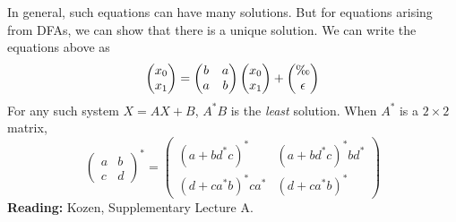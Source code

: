 In general, such equations can have many solutions.
But for equations arising from DFAs, we can show that there is a unique
solution.
We can write the equations above as \[
    \begin{pmatrix}
        x_0 \\
        x_1
    \end{pmatrix} = \begin{pmatrix}
        b & a \\
        a & b
    \end{pmatrix} \begin{pmatrix}
        x_0 \\
        x_1
    \end{pmatrix} + \begin{pmatrix}
        \O \\
        \epsilon
    \end{pmatrix}
\]
For any such system $X = AX + B$, $A^*B$ is the \emph{least} solution.
When $A^*$ is a $2 \times 2$ matrix, \[
    \begin{pmatrix}
        a & b \\
        c & d
    \end{pmatrix}^* = \begin{pmatrix}
        (a + b d^* c)^* & (a + b d^* c)^* b d^* \\
        (d + c a^* b)^* c a^* & (d + c a^* b)^*
    \end{pmatrix}
\]
\textbf{Reading:} Kozen, Supplementary Lecture A.
